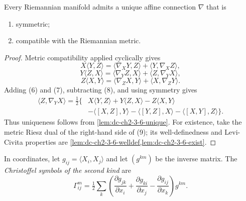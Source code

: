 \begin{theorem}
  \label{thm:dc-ch2-3-6}
  \leanok
  Every Riemannian manifold admits a unique affine connection $\nabla$ that is
  \begin{enumerate}
    \item[(a)] symmetric;
    \item[(b)] compatible with the Riemannian metric.
  \end{enumerate}
\end{theorem}
\begin{proof}
  \leanok
  \sketch
  Metric compatibility applied cyclically gives
  \[
    X\langle Y,Z\rangle
      =\langle\nabla_XY,Z\rangle+\langle Y,\nabla_XZ\rangle,\tag{6}
  \]
  \[
    Y\langle Z,X\rangle
      =\langle\nabla_YZ,X\rangle+\langle Z,\nabla_YX\rangle,\tag{7}
  \]
  \[
    Z\langle X,Y\rangle
      =\langle\nabla_ZX,Y\rangle+\langle X,\nabla_ZY\rangle.\tag{8}
  \]
  Adding (6) and (7), subtracting (8), and using symmetry gives
  \[
    \begin{aligned}
    \langle Z,\nabla_YX\rangle=\tfrac12\{&X\langle Y,Z\rangle
      +Y\langle Z,X\rangle-Z\langle X,Y\rangle\\
      &-\langle[X,Z],Y\rangle-\langle[Y,Z],X\rangle
       -\langle[X,Y],Z\rangle\}.\tag{9}
    \end{aligned}
  \]
  Thus uniqueness follows from \cref{lem:dc-ch2-3-6-unique}. For existence,
  take the metric Riesz dual of the right-hand side of (9); its
  well-definedness and Levi-Civita properties are
  \cref{lem:dc-ch2-3-6-welldef,lem:dc-ch2-3-6-exist}.
\end{proof}

\begin{definition}
  \label{def:dc-ch2-3-7-christoffel}
  \leanok
  In coordinates, let $g_{ij}=\langle X_i,X_j\rangle$ and let $(g^{km})$ be
  the inverse matrix. The \emph{Christoffel symbols of the second kind} are
  \[
    \Gamma_{ij}^m
      =\tfrac12\sum_k\left(
        \frac{\partial g_{jk}}{\partial x_i}
       +\frac{\partial g_{ki}}{\partial x_j}
       -\frac{\partial g_{ij}}{\partial x_k}\right)g^{km}.\tag{10}
  \]
\end{definition}

